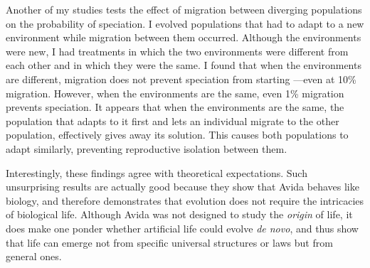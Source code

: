 \documentclass[12pt]{article}
\begin{document}
Another of my studies tests the effect of
migration between diverging populations on the probability of speciation.
%
I evolved populations that had to
adapt to a new environment while
migration between them occurred.
%
Although the environments were new,
I had treatments in which the two environments
were different from each other
and in which they were the same.
%
I found that when the environments are different,
migration does not prevent speciation from starting%
---even at 10\% migration.
%
However, when the environments are the same,
even 1\% migration prevents speciation.
%
It appears that when the environments are the same,
the population that adapts to it first
and lets an individual migrate to the other population,
effectively gives away its solution.
%
This causes both populations to adapt similarly,
preventing reproductive isolation between them.



Interestingly, these findings agree with theoretical expectations.
%
Such unsurprising results are actually good
because they show that Avida behaves like biology,
and therefore demonstrates that
evolution does not require the intricacies of biological life.
%
Although Avida was not designed to study the \emph{origin} of life,
it does make one ponder whether artificial life could evolve \emph{de novo},
and thus show that life can emerge
not from specific universal structures or laws
but from general ones.
\end{document}
